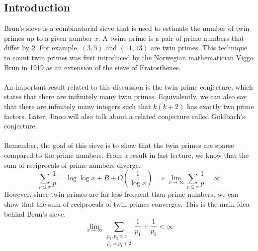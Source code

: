 \subsection{Introduction}
Brun's sieve is a combinatorial sieve that is used to estimate the number of twin primes up to a given number $x$. A twine prime is a pair of prime numbers that differ by $2$. For example, $(3,5)$ and $(11,13)$ are twin primes. 
This technique to count twin primes was first introduced by the Norwegian mathematician Viggo Brun in 1919 as an extension of the sieve of Eratosthenes.\\
\\
An important result related to this discussion is the twin prime conjecture, which states that there are inifinitely many twin primes. Equivalently, we can also say that there are infinitely many integers such that $k(k+2)$ has exactly two prime factors. Later, Jinoo will also talk about a related conjecture called Goldbach's conjecture. \\
\\
Remember, the goal of this sieve is to show that the twin primes are sparse compared to the prime numbers. From a result in last lecture, we know that the sum of reciprocals of prime numbers diverge.
$$
\sum_{p \leq x} \frac{1}{p} = \log \log x + B + O\left(\frac{1}{\log x}\right) \implies \lim_{x\rightarrow\infty} \sum_{p \leq x} \frac{1}{p} = \infty
$$
However, since twin primes are far less frequent than prime numbers, we can show that the sum of reciprocals of twin primes converges. This is the main idea behind Brun's sieve.
$$
\lim_{x\rightarrow \infty} \sum_{\substack{p_1, p_2 \leq x \\ p_2 = p_1 + 2}} \frac{1}{p_1} + \frac{1}{p_2} < \infty
$$
